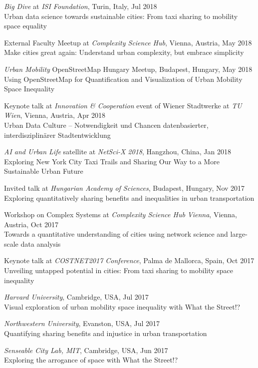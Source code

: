 \documentclass[10pt,a4paper]{article}
\renewenvironment{itemize}{
  \begin{list}{}{
    \setlength{\leftmargin}{1.5em}
    \setlength{\itemsep}{0.25em}
    \setlength{\parskip}{0pt}
    \setlength{\parsep}{0.25em}
  }
}{
  \end{list}
}
\begin{document}
\begin{itemize}
\item{\emph{Big Dive} at \emph{ISI Foundation}, Turin, Italy, Jul 2018\\Urban data science towards sustainable cities: From taxi sharing to mobility space equality}
\item{External Faculty Meetup at \emph{Complexity Science Hub}, Vienna, Austria, May 2018\\Make cities great again: Understand urban complexity, but embrace simplicity}
\item{\emph{Urban Mobility} OpenStreetMap Hungary Meetup, Budapest, Hungary, May 2018\\Using OpenStreetMap for Quantification and Visualization of Urban Mobility Space Inequality}
\item{Keynote talk at \emph{Innovation \& Cooperation} event of Wiener Stadtwerke at \emph{TU Wien}, Vienna, Austria, Apr 2018\\Urban Data Culture -- Notwendigkeit und Chancen datenbasierter, interdisziplinärer Stadtentwicklung}
\item{\emph{AI and Urban Life} satellite at \emph{NetSci-X 2018}, Hangzhou, China, Jan 2018\\Exploring New York City Taxi Trails and Sharing Our Way to a More Sustainable Urban Future}
\item{Invited talk at \emph{Hungarian Academy of Sciences}, Budapest, Hungary, Nov 2017\\Exploring quantitatively sharing benefits and inequalities in urban transportation}
\item{Workshop on Complex Systems at \emph{Complexity Science Hub Vienna}, Vienna, Austria, Oct 2017\\Towards a quantitative understanding of cities using network science and large-scale data analysis}
\item{Keynote talk at \emph{COSTNET2017 Conference}, Palma de Mallorca, Spain, Oct 2017\\Unveiling untapped potential in cities: From taxi sharing to mobility space inequality}
\item{\emph{Harvard University}, Cambridge, USA, Jul 2017\\Visual exploration of urban mobility space inequality with What the Street!?}
\item{\emph{Northwestern University}, Evanston, USA, Jul 2017\\Quantifying sharing benefits and injustice in urban transportation}
\item{\emph{Senseable City Lab, MIT}, Cambridge, USA, Jun 2017\\Exploring the arrogance of space with What the Street!?}

\end{itemize}
\end{document}
